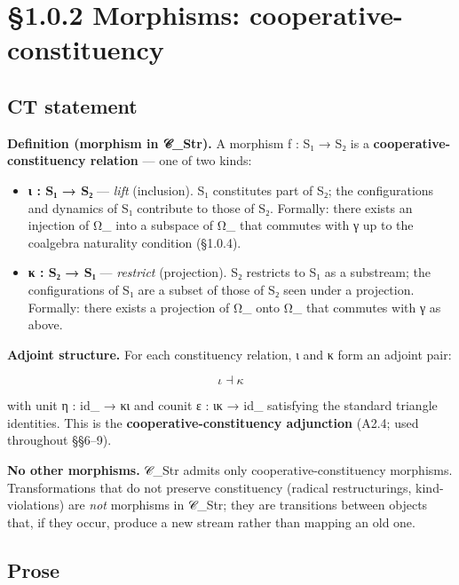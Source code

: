 \documentclass[11pt, openany]{book}
\newcommand{\sectionbreak}{\clearpage}
\begin{document}
\sectionbreak

\section{§1.0.2 Morphisms: cooperative-constituency}

\subsection{CT statement}

\textbf{Definition (morphism in 𝒞\_\allowbreak{}Str).} A morphism f : S₁ → S₂ is a \textbf{cooperative-constituency relation} --- one of two kinds:

\begin{itemize}
\item \textbf{ι : S₁ → S₂} --- \textit{lift} (inclusion). S₁ constitutes part of S₂; the configurations and dynamics of S₁ contribute to those of S₂. Formally: there exists an injection of Ω\_ into a subspace of Ω\_ that commutes with γ up to the coalgebra naturality condition (§1.0.4).
\item \textbf{κ : S₂ → S₁} --- \textit{restrict} (projection). S₂ restricts to S₁ as a substream; the configurations of S₁ are a subset of those of S₂ seen under a projection. Formally: there exists a projection of Ω\_ onto Ω\_ that commutes with γ as above.
\end{itemize}

\textbf{Adjoint structure.} For each constituency relation, ι and κ form an adjoint pair:

$$\iota \dashv \kappa$$

with unit η : id\_ → κι and counit ε : ικ → id\_ satisfying the standard triangle identities. This is the \textbf{cooperative-constituency adjunction} (A2.4; used throughout §§6–9).

\textbf{No other morphisms.} 𝒞\_\allowbreak{}Str admits only cooperative-constituency morphisms. Transformations that do not preserve constituency (radical restructurings, kind-violations) are \textit{not} morphisms in 𝒞\_\allowbreak{}Str; they are transitions between objects that, if they occur, produce a new stream rather than mapping an old one.

\subsection{Prose}
\end{document}
